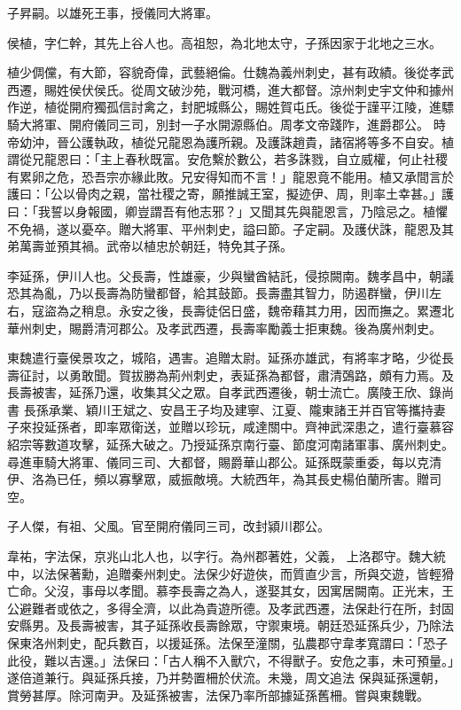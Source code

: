 \begin{pinyinscope}
 子昇嗣。以雄死王事，授儀同大將軍。



 侯植，字仁幹，其先上谷人也。高祖恕，為北地太守，子孫因家于北地之三水。



 植少倜儻，有大節，容貌奇偉，武藝絕倫。仕魏為義州刺史，甚有政績。後從孝武西遷，賜姓侯伏侯氏。從周文破沙苑，戰河橋，進大都督。涼州刺史宇文仲和據州作逆，植從開府獨孤信討禽之，封肥城縣公，賜姓賀屯氏。後從于謹平江陵，進驃騎大將軍、開府儀同三司，別封一子水開源縣伯。周孝文帝踐阼，進爵郡公。
 時帝幼沖，晉公護執政，植從兄龍恩為護所親。及護誅趙貴，諸宿將等多不自安。植謂從兄龍恩曰：「主上春秋既富。安危繫於數公，若多誅戮，自立威權，何止社稷有累卵之危，恐吾宗亦緣此敗。兄安得知而不言！」龍恩竟不能用。植又承間言於護曰：「公以骨肉之親，當社稷之寄，願推誠王室，擬迹伊、周，則率土幸甚。」護曰：「我誓以身報國，卿豈謂吾有他志邪？」又聞其先與龍恩言，乃陰忌之。植懼不免禍，遂以憂卒。贈大將軍、平州刺史，謚曰節。子定嗣。及護伏誅，龍恩及其弟萬壽並預其禍。武帝以植忠於朝廷，特免其子孫。



 李延孫，伊川人也。父長壽，性雄豪，少與蠻酋結託，侵掠闕南。魏孝昌中，朝議恐其為亂，乃以長壽為防蠻都督，給其鼓節。長壽盡其智力，防遏群蠻，伊川左右，寇盜為之稍息。永安之後，長壽徒侶日盛，魏帝藉其力用，因而撫之。累遷北華州刺史，賜爵清河郡公。及孝武西遷，長壽率勵義士拒東魏。後為廣州刺史。



 東魏遣行臺侯景攻之，城陷，遇害。追贈太尉。延孫亦雄武，有將率才略，少從長壽征討，以勇敢聞。賀拔勝為荊州刺史，表延孫為都督，肅清鵶路，頗有力焉。及長壽被害，延孫乃還，收集其父之眾。自孝武西遷後，朝士流亡。廣陵王欣、錄尚書
 長孫承業、穎川王斌之、安昌王子均及建寧、江夏、隴東諸王并百官等攜持妻子來投延孫者，即率眾衛送，並贈以珍玩，咸達關中。齊神武深患之，遣行臺慕容紹宗等數道攻擊，延孫大破之。乃授延孫京南行臺、節度河南諸軍事、廣州刺史。尋進車騎大將軍、儀同三司、大都督，賜爵華山郡公。延孫既蒙重委，每以克清伊、洛為已任，頻以寡擊眾，威振敵境。大統西年，為其長史楊伯蘭所害。贈司空。



 子人傑，有祖、父風。官至開府儀同三司，改封潁川郡公。



 韋祐，字法保，京兆山北人也，以字行。為州郡著姓，父義，
 上洛郡守。魏大統中，以法保著勳，追贈秦州刺史。法保少好遊俠，而質直少言，所與交遊，皆輕猾亡命。父沒，事母以孝聞。慕李長壽之為人，遂娶其女，因寓居闕南。正光末，王公避難者或依之，多得全濟，以此為貴遊所德。及孝武西遷，法保赴行在所，封固安縣男。及長壽被害，其子延孫收長壽餘眾，守禦東境。朝廷恐延孫兵少，乃除法保東洛州刺史，配兵數百，以援延孫。法保至潼關，弘農郡守韋孝寬謂曰：「恐子此役，難以吉還。」法保曰：「古人稱不入獸穴，不得獸子。安危之事，未可預量。」遂倍道兼行。與延孫兵接，乃并勢置柵於伏流。未幾，周文追法
 保與延孫還朝，賞勞甚厚。除河南尹。及延孫被害，法保乃率所部據延孫舊柵。嘗與東魏戰。




\end{pinyinscope}
